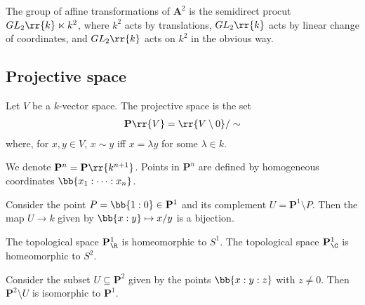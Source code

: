 \documentclass{article}
\begin{document}
\begin{proposition}
  The group of affine transformations of $\mathbf A^2$ is the semidirect procut
  $GL_2\rr{k}\ltimes k^2$, where $k^2$ acts by translations, $GL_2\rr{k}$ acts by
  linear change of coordinates, and $GL_2\rr{k}$ acts on $k^2$ in the obvious way.
\end{proposition}

\subsection{Projective space}\label{sec:projective_space}

\begin{definition}
  Let $V$ be a $k$-vector space. The projective space is the set
  \begin{align*}
    \mathbf P\rr{V} = \rr{V\setminus 0} / \sim
  \end{align*}
  where, for $x,y\in V$, $x\sim y$ iff $x=\lambda y$ for some $\lambda\in k$.
  
  We denote $\mathbf P^n = \mathbf P\rr{k^{n+1}}$.
  Points in $\mathbf P^n$ are defined by homogeneous coordinates
  $\bb{x_1 : \cdots : x_n}$.
\end{definition}

\begin{proposition}
  Consider the point $P=\bb{1:0}\in\mathbf P^1$ and its complement
  $U=\mathbf P^1\setminus P$. Then the map $U\to k$ given by $\bb{x:y}\mapsto x/y$
  is a bijection.
\end{proposition}

\begin{theorem}
  The topological space $\mathbf P^1_{\R}$ is homeomorphic to $S^1$. The topological space
  $\mathbf P^1_{\C}$ is homeomorphic to $S^2$.
\end{theorem}

\begin{proposition}
  Consider the subset $U\subseteq\mathbf P^2$ given by the points $\bb{x:y:z}$ with
  $z\neq 0$. Then $\mathbf P^2\setminus U$ is isomorphic to $\mathbf P^1$.
\end{proposition}
\end{document}
